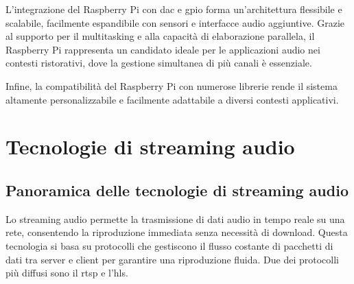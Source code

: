 L’integrazione del Raspberry Pi con \gls{dac} e \gls{gpio} forma un’architettura flessibile e scalabile, facilmente espandibile con sensori e interfacce audio aggiuntive. Grazie al supporto per il multitasking e alla capacità di elaborazione parallela, il Raspberry Pi rappresenta un candidato ideale per le applicazioni audio nei contesti ristorativi, dove la gestione simultanea di più canali è essenziale. \cite{raspberrypi_doc}

Infine, la compatibilità del Raspberry Pi con numerose librerie rende il sistema altamente personalizzabile e facilmente adattabile a diversi contesti applicativi.

\newpage
\section{Tecnologie di streaming audio}

\subsection{Panoramica delle tecnologie di streaming audio}
\noindent

Lo streaming audio permette la trasmissione di dati audio in tempo reale su una rete, consentendo la riproduzione immediata senza necessità di download. Questa tecnologia si basa su protocolli che gestiscono il flusso costante di pacchetti di dati tra server e client  per garantire una riproduzione fluida. Due dei protocolli più diffusi sono il \gls{rtsp} e l'\gls{hls}. 

